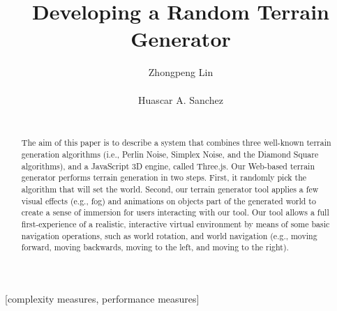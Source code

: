 \documentclass{acm_proc_article-sp}
\begin{document}
\title{Developing a Random Terrain Generator}
\author{
  \alignauthor Zhongpeng Lin \\
   \\
  \alignauthor Huascar A. Sanchez \\
   \\
}

\maketitle
\begin{abstract}
The aim of this paper is to describe a system that combines three well-known terrain generation algorithms (i.e., Perlin Noise, Simplex Noise, and the Diamond Square algorithms), and a JavaScript 3D engine, called Three.js. Our Web-based terrain generator performs terrain generation in two steps. First, it randomly pick the algorithm that will set the world. Second, our terrain generator tool applies a few visual effects (e.g., fog) and animations on objects part of the generated world to create a sense of immersion for users interacting with our tool. Our tool allows a full first-experience of a realistic, interactive virtual environment by means of some basic navigation operations, such as world rotation, and world navigation (e.g., moving forward, moving backwards, moving to the left, and moving to the right). 
\end{abstract}

[complexity measures, performance measures]











\end{document}
